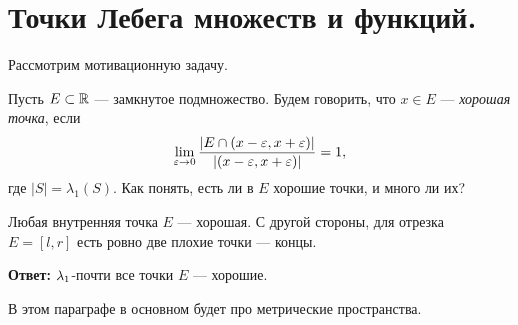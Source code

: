 
\section{Точки Лебега множеств и функций.}

Рассмотрим мотивационную задачу.

\begin{problem}
 \label{problem:motivatinal_problem_good_points_in_closed_subset}
 Пусть $E \subset \mathbb{R}$ --- замкнутое подмножество. Будем говорить, что $x \in E$ --- \textit{хорошая точка}, если \begin{align*}
  \lim_{\varepsilon \to 0} \frac{\left| E \cap (x - \varepsilon, x + \varepsilon) \right| }{\left| (x - \varepsilon, x + \varepsilon) \right|} = 1
 ,\end{align*} где $\left| S \right| = \lambda_1(S)$. Как понять, есть ли в $E$ хорошие точки, и много ли их?

 Любая внутренняя точка $E$ --- хорошая. С другой стороны, для отрезка $E = [l,r]$ есть ровно две плохие точки --- концы.

 \textbf{Ответ:} $\lambda_{1}$-почти все точки  $E$ --- хорошие.
\end{problem}

В этом параграфе в основном будет про метрические пространства.

